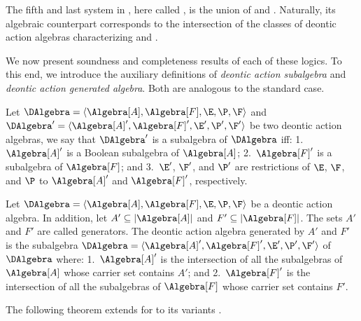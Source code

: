 The fifth and last system in \cite{Trypuz15}, here called , is the union of  and . Naturally, its
algebraic counterpart corresponds to the intersection of the classes of deontic action algebras characterizing  and .

We now present soundness and completeness results of each of these logics. 
To this end, we introduce the auxiliary definitions of \emph{deontic action subalgebra} and  \emph{deontic action generated algebra}.
Both are analogous to the standard case.

\medskip
\begin{definition}\label{def:deontic-subalgebra} Let $\DAlgebra = \langle \Algebra[A], \Algebra[F], \E, \P, \F \rangle$ and $\DAlgebra' = \langle \Algebra[A]', \Algebra[F]', \E', \P', \F' \rangle$ be two deontic action algebras, we say that 
$\DAlgebra'$ is a subalgebra of $\DAlgebra$ iff: 1.~$\Algebra[A]'$ is a Boolean subalgebra of $\Algebra[A]$; 2.~$\Algebra[F]'$ is a subalgebra of $\Algebra[F]$; and 3.~$\E'$, $\F'$, and $\P'$ are restrictions of $\E$, $\F$, and $\P$ to $\Algebra[A]'$ and $\Algebra[F]'$, respectively.
\end{definition}
\medskip



\begin{definition} Let $\DAlgebra = \langle \Algebra[A], \Algebra[F], \E, \P, \F \rangle$ be a deontic action algebra.
In addition, let $A' \subseteq |\Algebra[A]|$ and $F' \subseteq |\Algebra[F]|$.
The sets $A'$ and $F'$ are called generators.
The deontic action algebra generated by $A'$ and $F'$ is the subalgebra $\DAlgebra = \langle \Algebra[A]', \Algebra[F]', \E', \P', \F' \rangle$ of $\DAlgebra$ where: 1.~$\Algebra[A]'$ is the intersection of all the subalgebras of $\Algebra[A]$ whose carrier set contains $A'$; and 2.~$\Algebra[F]'$ is the intersection of all the subalgebras of $\Algebra[F]$ whose carrier set contains $F'$.
\end{definition}
\medskip

The following theorem extends  for \DAL to its variants .

\medskip

